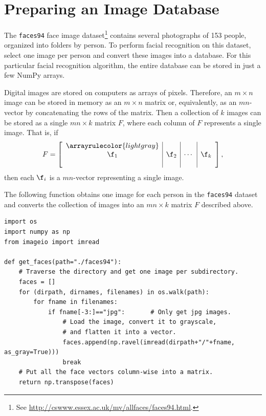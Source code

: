 \label{lab:FacialRecognition}


\section*{Preparing an Image Database} %

The \texttt{faces94} face image dataset\footnote{See \url{http://cswww.essex.ac.uk/mv/allfaces/faces94.html}.} contains several photographs of 153 people, organized into folders by person.
To perform facial recognition on this dataset, select one image per person and convert these images into a database.
For this particular facial recognition algorithm, the entire database can be stored in just a few NumPy arrays.

Digital images are stored on computers as arrays of pixels.
Therefore, an $m \times n$ image can be stored in memory as an $m\times n$ matrix or, equivalently, as an $mn$-vector by concatenating the rows of the matrix.
Then a collection of $k$ images can be stored as a single $mn\times k$ matrix $F$, where each column of $F$ represents a single image.
That is, if
\[
F = \left[\begin{array}{c|c|c|c}
\arrayrulecolor{lightgray}
& & & \\
\f_1 & \f_2 & \cdots & \f_k
\\
& & &
\end{array}\right],
\]
then each $\f_i$ is a $mn$-vector representing a single image.

The following function obtains one image for each person in the \texttt{faces94} dataset and converts the collection of images into an $mn \times k$ matrix $F$ described above.

\begin{lstlisting}
import os
import numpy as np
from imageio import imread

def get_faces(path="./faces94"):
    # Traverse the directory and get one image per subdirectory.
    faces = []
    for (dirpath, dirnames, filenames) in os.walk(path):
        for fname in filenames:
            if fname[-3:]=="jpg":       # Only get jpg images.
                # Load the image, convert it to grayscale,
                # and flatten it into a vector.
                faces.append(np.ravel(imread(dirpath+"/"+fname, as_gray=True)))
                break
    # Put all the face vectors column-wise into a matrix.
    return np.transpose(faces)
\end{lstlisting}

